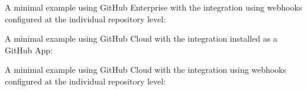   
\pagebreak
A minimal example using GitHub Enterprise with the \cxoneflow integration using
webhooks configured at the individual repository level:





\pagebreak
A minimal example using GitHub Cloud with the \cxoneflow integration installed
as a GitHub App:


  
  
\pagebreak
A minimal example using GitHub Cloud with the \cxoneflow integration using
webhooks configured at the individual repository level:

